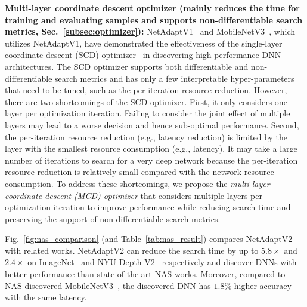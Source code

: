 \textbf{Multi-layer coordinate descent optimizer (mainly reduces the time for training and evaluating samples and supports non-differentiable search metrics, Sec.~\ref{subsec:optimizer}):} NetAdaptV1~\cite{eccv2018-netadapt} and MobileNetV3~\cite{Howard_2019_ICCV}, which utilizes NetAdaptV1, have demonstrated the effectiveness of the single-layer coordinate descent (SCD) optimizer~\cite{book2020sze} in discovering high-performance DNN architectures. The SCD optimizer supports both differentiable and non-differentiable search metrics and has only a few interpretable hyper-parameters that need to be tuned, such as the per-iteration resource reduction. However, there are two shortcomings of the SCD optimizer. First, it only considers one layer per optimization iteration. Failing to consider the joint effect of multiple layers may lead to a worse decision and hence sub-optimal performance. Second, the per-iteration resource reduction (e.g., latency reduction) is limited by the layer with the smallest resource consumption (e.g., latency). It may take a large number of iterations to search for a very deep network because the per-iteration resource reduction is relatively small compared with the network resource consumption. To address these shortcomings,  we propose the \emph{multi-layer coordinate descent (MCD) optimizer} that considers multiple layers per optimization iteration to improve performance while reducing search time and preserving the support of non-differentiable search metrics.

Fig.~\ref{fig:nas_comparison} (and Table~\ref{tab:nas_result}) compares NetAdaptV2 with related works. NetAdaptV2 can reduce the search time by up to $5.8\times$ and $2.4\times$ on ImageNet~\cite{imagenet_cvpr09} and NYU Depth V2~\cite{nyudepth} respectively and discover DNNs with better performance than state-of-the-art NAS works. Moreover, compared to NAS-discovered MobileNetV3~\cite{Howard_2019_ICCV}, the discovered DNN has $1.8\%$ higher accuracy with the same latency.

